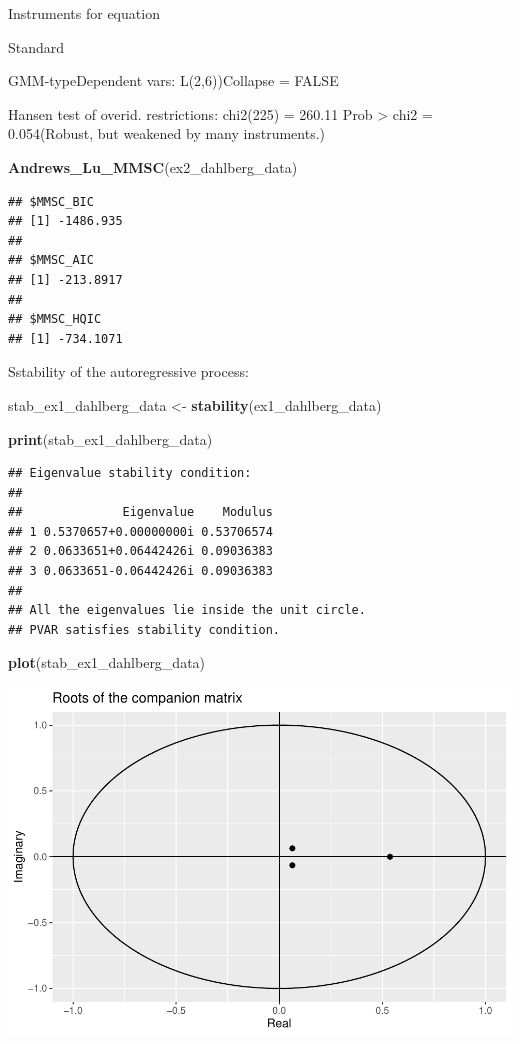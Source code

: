 \documentclass[
]{book}
\newenvironment{Shaded}{\begin{snugshade}}{\end{snugshade}}
\newcommand{\FunctionTok}[1]{\textcolor[rgb]{0.13,0.29,0.53}{\textbf{#1}}}
\newcommand{\NormalTok}[1]{#1}
\newcommand{\OtherTok}[1]{\textcolor[rgb]{0.56,0.35,0.01}{#1}}
\begin{document}
Instruments for equation

Standard

GMM-typeDependent vars: L(2,6))Collapse = FALSE

Hansen test of overid. restrictions: chi2(225) = 260.11 Prob \textgreater{} chi2 = 0.054(Robust, but weakened by many instruments.)

\begin{Shaded}
\begin{Highlighting}[]
\FunctionTok{Andrews\_Lu\_MMSC}\NormalTok{(ex2\_dahlberg\_data)}
\end{Highlighting}
\end{Shaded}

\begin{verbatim}
## $MMSC_BIC
## [1] -1486.935
## 
## $MMSC_AIC
## [1] -213.8917
## 
## $MMSC_HQIC
## [1] -734.1071
\end{verbatim}

Sstability of the autoregressive process:

\begin{Shaded}
\begin{Highlighting}[]
\NormalTok{stab\_ex1\_dahlberg\_data }\OtherTok{\textless{}{-}} \FunctionTok{stability}\NormalTok{(ex1\_dahlberg\_data)}

\FunctionTok{print}\NormalTok{(stab\_ex1\_dahlberg\_data)}
\end{Highlighting}
\end{Shaded}

\begin{verbatim}
## Eigenvalue stability condition:
## 
##              Eigenvalue    Modulus
## 1 0.5370657+0.00000000i 0.53706574
## 2 0.0633651+0.06442426i 0.09036383
## 3 0.0633651-0.06442426i 0.09036383
## 
## All the eigenvalues lie inside the unit circle.
## PVAR satisfies stability condition.
\end{verbatim}

\begin{Shaded}
\begin{Highlighting}[]
\FunctionTok{plot}\NormalTok{(stab\_ex1\_dahlberg\_data)}
\end{Highlighting}
\end{Shaded}

\includegraphics{Notas-Series-Tiempo_files/figure-latex/unnamed-chunk-52-1.pdf}
\end{document}
